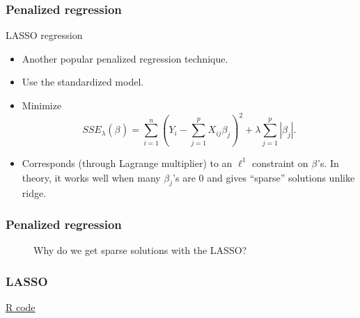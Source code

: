 \documentclass[handout]{beamer}
\newcommand{\B}[1]{\beta_{#1}}
\begin{document}
   \begin{frame} \frametitle{Penalized regression}

   \begin{block}
    {LASSO regression}
        \begin{itemize}
        \item Another popular penalized regression technique.

        \item Use the standardized model.
        \item Minimize
    $$
    SSE_{\lambda}(\B{}) = \sum_{i=1}^n \left(Y_i - \sum_{j=1}^{p} X_{ij} \B{j}\right)^2 + \lambda \sum_{j=1}^p |\B{j}|.$$

    \item Corresponds (through Lagrange multiplier) to an $\ell^1$ constraint on $\B{}$'s. In theory, it works well when many $\B{j}$'s are 0 and gives ``sparse'' solutions unlike ridge.

        \end{itemize}

   \end{block}
   \end{frame}


   \begin{frame} \frametitle{Penalized regression}

     \begin{figure}
         \centering

         Why do we get sparse solutions with the LASSO?

        \end{figure}
   \end{frame}



   \begin{frame}
   \frametitle{LASSO}
   \begin{center}
   \end{center}
   \href{http://www.stanford.edu/class/stats191/penalized.html#lasso}{R code}
   \end{frame}

\end{document}
